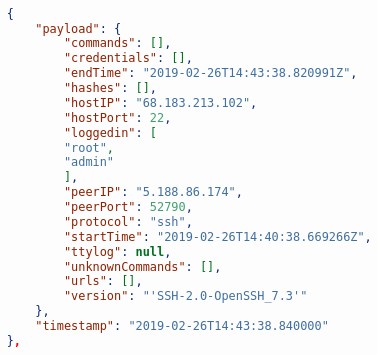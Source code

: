 
\begin{figure}[H]
\begin{lstlisting}[language=json, 
    caption={Sample attack data gathered from the London HoneyPot. (ID fields omitted for brevity.)},
    captionpos=b, label={lst:data}]

    { 
        "payload": {
            "commands": [], 
            "credentials": [], 
            "endTime": "2019-02-26T14:43:38.820991Z", 
            "hashes": [], 
            "hostIP": "68.183.213.102", 
            "hostPort": 22, 
            "loggedin": [
            "root", 
            "admin"
            ], 
            "peerIP": "5.188.86.174", 
            "peerPort": 52790, 
            "protocol": "ssh", 
            "startTime": "2019-02-26T14:40:38.669266Z", 
            "ttylog": null, 
            "unknownCommands": [], 
            "urls": [], 
            "version": "'SSH-2.0-OpenSSH_7.3'"
        }, 
        "timestamp": "2019-02-26T14:43:38.840000"
    }, 

    \end{lstlisting}
\end{figure}